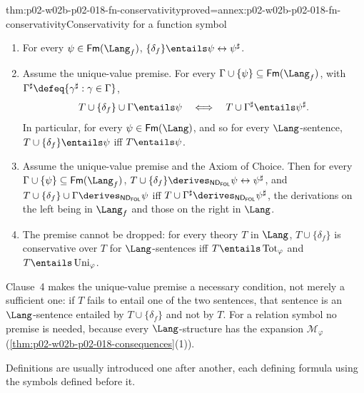 \begin{hbcorollary}{thm:p02-w02b-p02-018-fn-conservativity}{proved=annex:p02-w02b-p02-018-fn-conservativity}{Conservativity for a function symbol}
\begin{enumerate}
 \item For every \(\psi\in\mathsf{Fm}(\Lang_f)\),
       \(\{\delta_f\}\entails\psi\leftrightarrow\psi^{\sharp}\).
 \item Assume the unique-value premise.  For every
       \(\Gamma\cup\{\psi\}\subseteq\mathsf{Fm}(\Lang_f)\), with
       \(\Gamma^{\sharp}\defeq\{\gamma^{\sharp}:\gamma\in\Gamma\}\),
       \[
        T\cup\{\delta_f\}\cup\Gamma\entails\psi
        \quad\Longleftrightarrow\quad
        T\cup\Gamma^{\sharp}\entails\psi^{\sharp}.
       \]
       In particular, for every \(\psi\in\mathsf{Fm}(\Lang)\), and so for
       every \(\Lang\)-sentence,
       \(T\cup\{\delta_f\}\entails\psi\) iff \(T\entails\psi\).
 \item Assume the unique-value premise and the Axiom of Choice.  Then for
       every \(\Gamma\cup\{\psi\}\subseteq\mathsf{Fm}(\Lang_f)\),
       \(T\cup\{\delta_f\}\derives_{\mathsf{ND}_{\mathsf{FOL}}}
       \psi\leftrightarrow\psi^{\sharp}\), and
       \(T\cup\{\delta_f\}\cup\Gamma\derives_{\mathsf{ND}_{\mathsf{FOL}}}\psi\)
       iff \(T\cup\Gamma^{\sharp}\derives_{\mathsf{ND}_{\mathsf{FOL}}}\psi^{\sharp}\),
       the derivations on the left being in \(\Lang_f\) and those on the
       right in \(\Lang\).
 \item The premise cannot be dropped: for every theory \(T\) in \(\Lang\),
       \(T\cup\{\delta_f\}\) is conservative over \(T\) for
       \(\Lang\)-sentences iff \(T\entails\operatorname{Tot}_{\varphi}\) and
       \(T\entails\operatorname{Uni}_{\varphi}\).
\end{enumerate}
\end{hbcorollary}

Clause~4 makes the unique-value premise a necessary condition, not merely a
sufficient one: if \(T\) fails to entail one of the two sentences, that
sentence is an \(\Lang\)-sentence entailed by \(T\cup\{\delta_f\}\) and not
by \(T\).  For a relation symbol no premise is needed, because every
\(\Lang\)-structure has the expansion \(\mathcal M_{\varphi}\)
(\cref{thm:p02-w02b-p02-018-consequences}(1)).

Definitions are usually introduced one after another, each defining
formula using the symbols defined before it.

